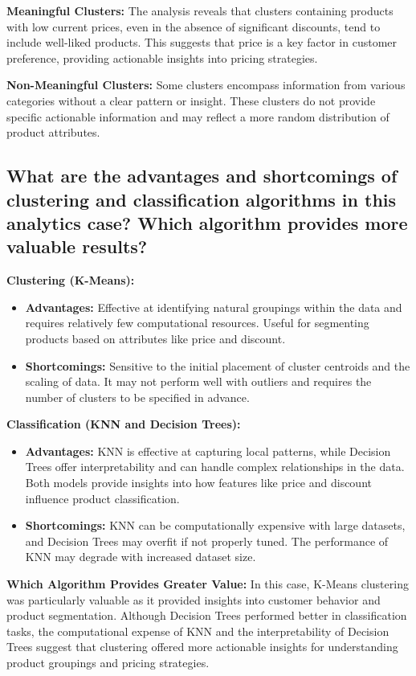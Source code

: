 \documentclass[a4paper,11pt]{article}
\begin{document}
\noindent
\textbf{Meaningful Clusters:} The analysis reveals that clusters containing products with low current prices, even in the absence of significant discounts, tend to include well-liked products. This suggests that price is a key factor in customer preference, providing actionable insights into pricing strategies.

\noindent
\textbf{Non-Meaningful Clusters:} Some clusters encompass information from various categories without a clear pattern or insight. These clusters do not provide specific actionable information and may reflect a more random distribution of product attributes.

\subsection{What are the advantages and shortcomings of clustering and classification algorithms in this analytics case? Which algorithm provides more valuable results?}

\noindent
\textbf{Clustering (K-Means):}
\begin{itemize}
    \item \textbf{Advantages:} Effective at identifying natural groupings within the data and requires relatively few computational resources. Useful for segmenting products based on attributes like price and discount.
    \item \textbf{Shortcomings:} Sensitive to the initial placement of cluster centroids and the scaling of data. It may not perform well with outliers and requires the number of clusters to be specified in advance.
\end{itemize}

\noindent
\textbf{Classification (KNN and Decision Trees):}
\begin{itemize}
    \item \textbf{Advantages:} KNN is effective at capturing local patterns, while Decision Trees offer interpretability and can handle complex relationships in the data. Both models provide insights into how features like price and discount influence product classification.
    \item \textbf{Shortcomings:} KNN can be computationally expensive with large datasets, and Decision Trees may overfit if not properly tuned. The performance of KNN may degrade with increased dataset size.
\end{itemize}

\noindent
\textbf{Which Algorithm Provides Greater Value:} In this case, K-Means clustering was particularly valuable as it provided insights into customer behavior and product segmentation. Although Decision Trees performed better in classification tasks, the computational expense of KNN and the interpretability of Decision Trees suggest that clustering offered more actionable insights for understanding product groupings and pricing strategies.
\end{document}
